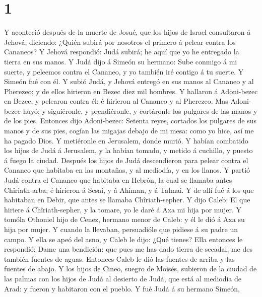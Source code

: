 \hypertarget{section}{%
\section{1}\label{section}}

 Y aconteció después de la muerte de Josué, que los hijos
de Israel consultaron á Jehová, diciendo: ¿Quién subirá por nosotros el
primero á pelear contra los Cananeos?  Y Jehová respondió:
Judá subirá; he aquí que yo he entregado la tierra en sus manos.
 Y Judá dijo á Simeón su hermano: Sube conmigo á mi
suerte, y peleemos contra el Cananeo, y yo también iré contigo á tu
suerte. Y Simeón fué con él.  Y subió Judá, y Jehová
entregó en sus manos al Cananeo y al Pherezeo; y de ellos hirieron en
Bezec diez mil hombres.  Y hallaron á Adoni-bezec en
Bezec, y pelearon contra él: é hirieron al Cananeo y al Pherezeo.
 Mas Adoni-bezec huyó; y siguiéronle, y prendiéronle, y
cortáronle los pulgares de las manos y de los pies. 
Entonces dijo Adoni-bezec: Setenta reyes, cortados los pulgares de sus
manos y de sus pies, cogían las migajas debajo de mi mesa: como yo hice,
así me ha pagado Dios. Y metiéronle en Jerusalem, donde murió.
 Y habían combatido los hijos de Judá á Jerusalem, y la
habían tomado, y metido á cuchillo, y puesto á fuego la ciudad.
 Después los hijos de Judá descendieron para pelear contra
el Cananeo que habitaba en las montañas, y al mediodía, y en los llanos.
 Y partió Judá contra el Cananeo que habitaba en Hebrón,
la cual se llamaba antes Chîriath-arba; é hirieron á Sesai, y á Ahiman,
y á Talmai.  Y de allí fué á los que habitaban en Debir,
que antes se llamaba Chîriath-sepher.  Y dijo Caleb: El
que hiriere á Chîriath-sepher, y la tomare, yo le daré á Axa mi hija por
mujer.  Y tomóla Othoniel hijo de Cenez, hermano menor de
Caleb: y él le dió á Axa su hija por mujer.  Y cuando la
llevaban, persuadióle que pidiese á su padre un campo. Y ella se apeó
del asno, y Caleb le dijo: ¿Qué tienes?  Ella entonces le
respondió: Dame una bendición: que pues me has dado tierra de secadal,
me des también fuentes de aguas. Entonces Caleb le dió las fuentes de
arriba y las fuentes de abajo.  Y los hijos de Cineo,
suegro de Moisés, subieron de la ciudad de las palmas con los hijos de
Judá al desierto de Judá, que está al mediodía de Arad: y fueron y
habitaron con el pueblo.  Y fué Judá á su hermano Simeón,
